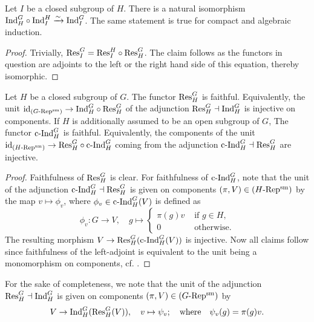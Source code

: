 \documentclass[../main.tex]{subfiles}
\begin{document}
\begin{prop}\label{prop:InductionOnTower}
  Let $I$ be a closed subgroup of $H$. There is a natural isomorphism $\mathrm{Ind}_H^G
  \circ \mathrm{Ind}_I^H \xrightarrow{\sim} \mathrm{Ind}_I^G$. 
  The same statement is true for compact and algebraic induction.
  \begin{proof}
    Trivially, $\mathrm{Res}_I^G = \mathrm{Res}_I^H \circ \mathrm{Res}_H^G$. The claim follows as the functors
    in question are adjoints to the left or the right hand side of this equation,
    thereby isomorphic.
  \end{proof}
\end{prop}

\begin{lem}\label{lem:FrobRecUnitsAreInjective}
  Let $H$ be a closed subgroup of $G$. The functor $\mathrm{Res}_H^G$ is faithful.
  Equivalently, the unit $\operatorname{id}_{{({G}\text-\allowbreak\mathrm{Rep^{\mathrm{sm}}})}} \to \mathrm{Ind}_H^G \circ \mathrm{Res}_H^G$ of 
  the adjunction $\mathrm{Res}_H^G \dashv \mathrm{Ind}_H^G$ is injective on components.
  If $H$ is additionally assumed to be an open subgroup of $G$,
  The functor $\mathrm{c\text{-}Ind}_H^G$ is faithful. 
  Equivalently, the components of the unit
    $\operatorname{id}_{{({H}\text-\allowbreak\mathrm{Rep^{\mathrm{sm}}})}} \to \mathrm{Res}_H^G \circ \mathrm{c\text{-}Ind}_H^G$
  coming from the adjunction $\mathrm{c\text{-}Ind}_H^G \dashv \mathrm{Res}_H^G$ are injective. 
\begin{proof}
  Faithfulness of $\mathrm{Res}_H^G$ is clear. For faithfulness of $\mathrm{c\text{-}Ind}_H^G$, note that 
  the unit of the adjunction $\mathrm{c\text{-}Ind}_H^G \dashv \mathrm{Res}_H^G$ is given 
  on components $(\pi, V) \in {({H}\text-\allowbreak\mathrm{Rep^{\mathrm{sm}}})}$ by the map 
  $v \mapsto \phi_v$, where $\phi_v \in \mathrm{c\text{-}Ind}_H^G(V)$ is defined as
  \begin{equation*}
    \phi_v\colon G \to V, \quad g \mapsto \begin{cases}
      \pi(g)v &\text{ if } g \in H,\\
      0       &\text{ otherwise.}
    \end{cases}
  \end{equation*}
  The resulting morphism $V \to \mathrm{Res}_H^G ( \mathrm{c\text{-}Ind}_H^G(V))$ is injective. Now all
  claims follow since faithfulness of the left-adjoint is 
  equivalent to the unit being a monomorphism on components, cf. \cite[Lemma
  4.5.13]{riehl2017category}.
\end{proof}
\end{lem}

\begin{rmk} 
  For the sake of completeness, we note that the unit of the adjunction 
  $\mathrm{Res}_H^G \dashv \mathrm{Ind}_H^G$ is given on components $(\pi, V) \in {({G}\text-\allowbreak\mathrm{Rep^{\mathrm{sm}}})}$ by
  \begin{equation*}
    V \to \mathrm{Ind}_H^G( \mathrm{Res}_H^G(V)), \quad v \mapsto \psi_v; \quad
    \text{where}\quad \psi_v(g) = \pi(g) v.
  \end{equation*}
\end{rmk}
\end{document}
